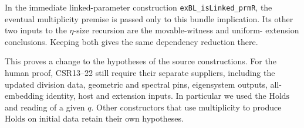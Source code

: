 In the immediate linked-parameter construction
\texttt{exBL\_isLinked\_prmR}, the eventual multiplicity premise
is passed only to this bundle implication. Its other two inputs
to the $\eta$-size recursion are the movable-witness and uniform-
extension conclusions. Keeping both gives the same dependency
reduction there.

This proves a change to the hypotheses of the source constructions.
For the human proof, CSR13--22 still require their separate suppliers,
including the updated division data, geometric and spectral pins,
eigensystem outputs, all-embedding identity, host and extension
inputs. In particular we used the $\mathrm{Holds}$ and reading of a
given $q$. Other constructors that use multiplicity to produce
$\mathrm{Holds}$ on initial data retain their own hypotheses.
